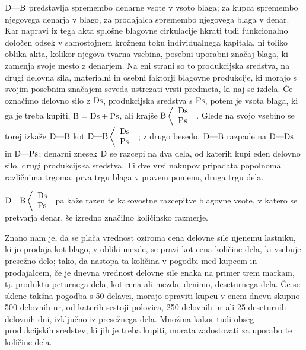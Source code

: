\documentclass[kapital_02.tex]{subfiles}
\begin{document}
\( \textrm{D}\textrm{---}\textrm{B} \) predstavlja spremembo denarne vsote v vsoto blaga; za kupca spremembo njegovega denarja v blago, za prodajalca spremembo njegovega blaga v denar. Kar napravi iz tega akta splošne blagovne cirkulacije hkrati tudi funkcionalno določen odsek v samostojnem krožnem toku individualnega kapitala, ni toliko oblika akta, kolikor njegova tvarna vsebina, posebni uporabni značaj blaga, ki zamenja svoje mesto z denarjem. Na eni strani so to produkcijska sredstva, na drugi delovna sila, materialni in osebni faktorji blagovne produkcije, ki morajo s svojim posebnim značajem seveda ustrezati vrsti predmeta, ki naj se izdela. Če označimo delovno silo z \( \textrm{Ds} \), produkcijska sredstva s \( \textrm{Ps} \), potem je vsota blaga, ki ga je treba kupiti, \( \textrm{B}=\textrm{Ds}+\textrm{Ps} \), ali krajše 
\( 
    \textrm{B}\left<
    \begin{array}{l}
        \textrm{Ds}\\
        \textrm{Ps}\\
    \end{array}
    \right.
\)
. Glede na svojo vsebino se torej izkaže \( \textrm{D}\textrm{---}\textrm{B} \) kot 
\( 
    \textrm{D}\textrm{---}\textrm{B}\left< 
    \begin{array}{l}
        \textrm{Ds}\\
        \textrm{Ps}\\
    \end{array}
    \right.
\)
; z drugo besedo, \( \textrm{D}\textrm{---}\textrm{B} \) razpade na \( \textrm{D}\textrm{---}\textrm{Ds} \) in \( \textrm{D}\textrm{---}\textrm{Ps} \); denarni znesek \( \textrm{D} \) se razcepi na dva dela, od katerih kupi eden delovno silo, drugi produkcijska sredstva. Ti dve vrsi nakupov pripadata popolnoma različnima trgoma: prva trgu blaga v pravem pomenu, druga trgu dela.

\( 
    \textrm{D}\textrm{---}\textrm{B}\left< 
    \begin{array}{l}
        \textrm{Ds}\\
        \textrm{Ps}\\
    \end{array}
    \right.
\) pa kaže razen te kakovostne razcepitve blagovne vsote, v katero se pretvarja denar, še izredno značilno količinsko razmerje.

Znano nam je, da se plača vrednost oziroma cena delovne sile njenemu lastniku, ki jo prodaja kot blago, v obliki mezde, se pravi kot cena količine dela, ki vsebuje presežno delo; tako, da nastopa ta količina v pogodbi med kupcem in prodajalcem, če je dnevna vrednost delovne sile enaka na primer trem markam, tj. produktu peturnega dela, kot cena ali mezda, denimo, deseturnega dela. Če se sklene takšna pogodba s 50 delavci, morajo opraviti kupcu v enem dnevu skupno 500 delovnih ur, od katerih sestoji polovica, 250 delovnih ur ali 25 deseturnih delovnih dni, izključno iz presežnega dela. Množina kakor tudi obseg produkcijskih sredstev, ki jih je treba kupiti, morata zadostovati za uporabo te količine dela.
\end{document}

